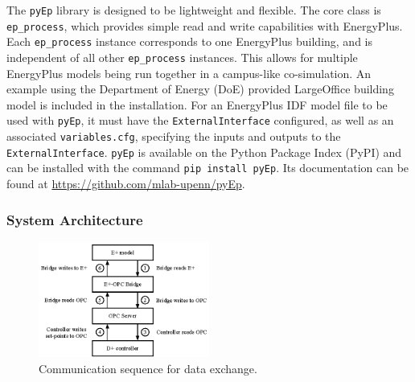 The \texttt{pyEp} library is designed to be lightweight and flexible. 
The core class is \texttt{ep\_process}, which provides simple read and write capabilities with EnergyPlus. 
Each \texttt{ep\_process} instance corresponds to one EnergyPlus building, and is independent of all other \texttt{ep\_process} instances. 
This allows for multiple EnergyPlus models being run together in a campus-like co-simulation. 
An example using the Department of Energy (DoE) provided LargeOffice building model is included in the installation. 
For an EnergyPlus IDF model file to be used with \texttt{pyEp}, it must have the \texttt{ExternalInterface} configured, as well as an associated \texttt{variables.cfg}, specifying the inputs and outputs to the \texttt{ExternalInterface}.
\texttt{pyEp} is available on the Python Package Index (PyPI) and can be installed with the command \verb|pip install pyEp|.
Its documentation can be found at \url{https://github.com/mlab-upenn/pyEp}.

\subsubsection{System Architecture}

\begin{figure}[t]
	\centering
	\includegraphics[width=0.5\textwidth]{images/architecture.eps}
	\caption{Communication sequence for data exchange.}
	\label{F:architecture}
\end{figure}


